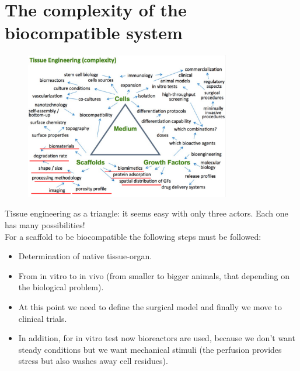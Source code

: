 \section{The complexity of the biocompatible system}
\begin{figure}[ht]
\centering
\includegraphics[width=0.8\textwidth]{piramide_completa.png}
\caption{\label{fig:complete_pyramid}}
\end{figure}
Tissue engineering as a triangle: it seems easy with only three actors.
Each one has many possibilities!
\\
For a scaffold to be biocompatible the following steps must be followed:

\begin{multicols}{2}
	\begin{itemize}
		\item Determination of native tissue-organ.
		\item From in vitro to in vivo (from smaller to bigger animals, that depending on the biological problem).
		\item At this point we need to define the surgical model and finally we move to clinical trials.
		\item In addition, for in vitro test now bioreactors are used, because we don't want steady conditions but we want mechanical stimuli (the perfusion provides stress but also washes away cell residues).
	\end{itemize}
\end{multicols}

